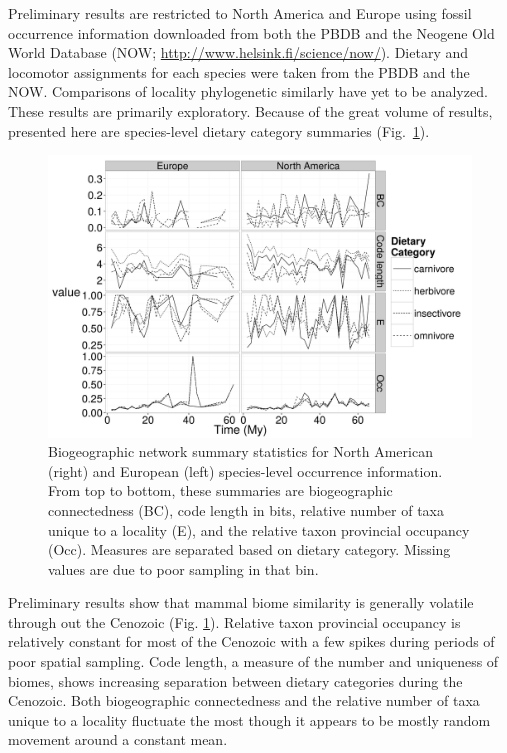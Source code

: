 \documentclass[11pt,letterpaper]{article}
\begin{document}
Preliminary results are restricted to North America and Europe using fossil occurrence information downloaded from both the PBDB and the Neogene Old World Database (NOW; \url{http://www.helsink.fi/science/now/}). Dietary and locomotor assignments for each species were taken from the PBDB and the NOW. Comparisons of locality phylogenetic similarly have yet to be analyzed. These results are primarily exploratory. Because of the great volume of results, presented here are species-level dietary category summaries (Fig.~\ref{fig:com}).

\begin{figure}[ht]
  \centering
  \includegraphics[width = \textwidth, height = 0.4\textheight, keepaspectratio = true]{figure/diets}
  \caption{Biogeographic network summary statistics for North American (right) and European (left) species-level occurrence information. From top to bottom, these summaries are biogeographic connectedness (BC), code length in bits, relative number of taxa unique to a locality (E), and the relative taxon provincial occupancy (Occ). Measures are separated based on dietary category. Missing values are due to poor sampling in that bin.}
  \label{fig:com}
\end{figure}

Preliminary results show that mammal biome similarity is generally volatile through out the Cenozoic (Fig. \ref{fig:com}). Relative taxon provincial occupancy is relatively constant for most of the Cenozoic with a few spikes during periods of poor spatial sampling. Code length, a measure of the number and uniqueness of biomes, shows increasing separation between dietary categories during the Cenozoic. Both biogeographic connectedness and the relative number of taxa unique to a locality fluctuate the most though it appears to be mostly random movement around a constant mean.
\end{document}
